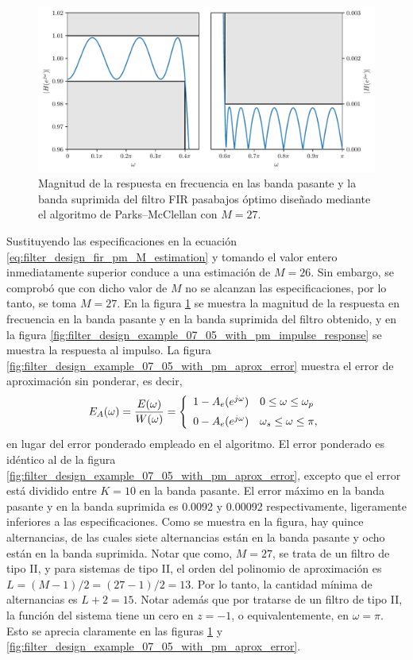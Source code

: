 \documentclass[a4paper]{report}
\begin{document}
\begin{figure}[!htb]
 \begin{center}
 \includegraphics[width=1\textwidth]{figuras/filter_design_example_07_05_with_pm_zoom.pdf}
 \caption{\label{fig:filter_design_example_07_05_with_pm_zoom} Magnitud de la respuesta en frecuencia en las banda pasante y la banda suprimida del filtro FIR pasabajos óptimo diseñado mediante el algoritmo de Parks--McClellan con \(M=27\).}
 \end{center}
\end{figure}
Sustituyendo las especificaciones en la ecuación \ref{eq:filter_design_fir_pm_M_estimation} y tomando el valor entero inmediatamente superior conduce a una estimación de \(M=26\). Sin embargo, se comprobó que con dicho valor de \(M\) no se alcanzan las especificaciones, por lo tanto, se toma \(M=27\). En la figura \ref{fig:filter_design_example_07_05_with_pm_zoom} se muestra la magnitud de la respuesta en frecuencia en la banda pasante y en la banda suprimida del filtro obtenido, y en la figura \ref{fig:filter_design_example_07_05_with_pm_impulse_response} se muestra la respuesta al impulso. La figura \ref{fig:filter_design_example_07_05_with_pm_aprox_error} muestra el error de aproximación sin ponderar, es decir,
\[
 E_A(\omega)=\frac{E(\omega)}{W(\omega)}=
 \left\{
 \begin{array}{ll}
  1-A_e(e^{j\omega}) & 0\leq\omega\leq\omega_p\\[\medskipamount]
  0-A_e(e^{j\omega}) & \omega_s\leq\omega\leq\pi,
 \end{array}
 \right.
\]
en lugar del error ponderado empleado en el algoritmo. El error ponderado es idéntico al de la figura \ref{fig:filter_design_example_07_05_with_pm_aprox_error}, excepto que el error está dividido entre \(K=10\) en la banda pasante. El error máximo en la banda pasante y en la banda suprimida es 0.0092 y 0.00092 respectivamente, ligeramente inferiores a las especificaciones. Como se muestra en la figura, hay quince alternancias, de las cuales siete alternancias están en la banda pasante y ocho están en la banda suprimida. Notar que como, \(M=27\), se trata de un filtro de tipo II, y para sistemas de tipo II, el orden del polinomio de aproximación es \(L=(M-1)/2=(27-1)/2=13\). Por lo tanto, la cantidad mínima de alternancias es \(L+2=15\). Notar además que por tratarse de un filtro de tipo II, la función del sistema tiene un cero en \(z=-1\), o equivalentemente, en \(\omega=\pi\). Esto se aprecia claramente en las figuras \ref{fig:filter_design_example_07_05_with_pm_zoom} y \ref{fig:filter_design_example_07_05_with_pm_aprox_error}.
\end{document}
